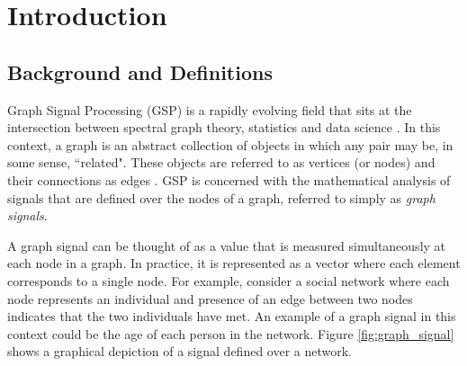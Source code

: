 


\pagestyle{fancy} %


\chapter{Introduction} %

\label{chap:ntroduction} %



\section{Background and Definitions}

Graph Signal Processing (GSP) is a rapidly evolving field that sits at the intersection between spectral graph theory, statistics and data science \citep{Shuman2013}. In this context, a graph is an abstract collection of objects in which any pair may be, in some sense, ``related". These objects are referred to as vertices (or nodes) and their connections as edges \citep{Newman2018}. GSP is concerned with the mathematical analysis of signals that are defined over the nodes of a graph, referred to simply as \textit{graph signals}. 

A graph signal can be thought of as a value that is measured simultaneously at each node in a graph. In practice, it is represented as a vector where each element corresponds to a single node. For example, consider a social network where each node represents an individual and presence of an edge between two nodes indicates that the two individuals have met. An example of a graph signal in this context could be the age of each person in the network. Figure \ref{fig:graph_signal} shows a graphical depiction of a  signal defined over a network. 
  


